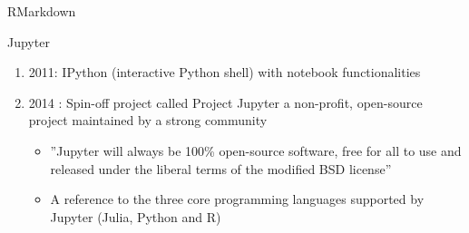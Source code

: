 \begin{frame}{RMarkdown}
\end{frame}

\begin{frame}[<+->]{Jupyter}
\begin{enumerate}
	\item 2011:  IPython (interactive Python shell) with notebook functionalities
	\item 2014 : Spin-oﬀ project called Project Jupyter a non-proﬁt, open-source project maintained by a strong community
		\begin{itemize}
		\item ”Jupyter will always be 100\% open-source software, free for all to use and released under the liberal terms of the modiﬁed BSD license”
		\item A reference to the three core programming languages supported by Jupyter (Julia, Python and R)
		\end{itemize}
\end{enumerate}
\end{frame}

